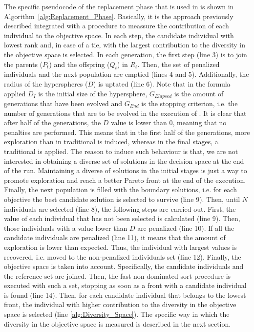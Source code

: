 The specific pseudocode of the replacement phase that is used in \VSDMOEA{} is shown in Algorithm~\ref{alg:Replacement_Phase}.
%
Basically, it is the approach previously described integrated with a procedure to meassure the contribution of each individual to the objective space.
%
In each step, the candidate individual with lowest rank and, in case of a tie, with the largest contribution to the diversity in the objective space is selected.
%
In each generation, the first step (line 3) is to join the parents ($P_t$) and the offspring ($Q_t$) in $R_t$.
%
Then, the set of penalized individuals and the next population are emptied (lines 4 and 5).
%
Additionally, the radius of the hyperspheres ($D$) is uptated (line 6).
%
Note that in the formula applied $D_I$ is the initial size of the hypersphere, $G_{Elapsed}$ is the amount of generations that have been evolved and $G_{End}$
is the stopping criterion, i.e. the number of generations that are to be evolved in the execution of \VSDMOEA{}.
%
It is clear that after half of the generations, the $D$ value is lower than 0, meaning that no penalties are performed.
%
This means that in the first half of the generations, more exploration than in traditional \MOEAS{} is induced, whereas 
in the final stages, a traditional \MOEA{} is applied.
%
The reason to induce such behaviour is that, we are not interested in obtaining a diverse set of solutions in the decision space at the end of the run.
%
Maintaining a diverse of solutions in the initial stages is just a way to promote exploration and reach a better Pareto front at the end of the execution.
%
Finally, the next population is filled with the boundary solutions, i.e. for each objective the best candidate solution is selected to survive (line 9).
%
Then, until $N$ individuals are selected (line 8), the following steps are carried out.
%
First, the \DCN{} value of each individual that has not been selected is calculated (line 9).
%
Then, those individuals with a \DCN{} value lower than $D$ are penalized (line 10).
%
If all the candidate individuals are penalized (line 11), it means that the amount of exploration is lower than expected.
%
Thus, the individual with largest \DCN{} values is recovered, i.e. moved to the non-penalized individuals set (line 12).
%
Finally, the objective space is taken into account.
%
Specifically, the candidate individuals and the reference set are joined.
%
Then, the fast-non-dominated-sort procedure is executed with such a set, stopping as soon as a front with a candidate individual is found (line 14).
%
Then, for each candidate individual that belongs to the lowest front, the individual with higher contribution to the diversity in the objective space is selected (line \ref{alg:Diversity_Space}).
%
The specific way in which the diversity in the objective space is measured is described in the next section.
%
%
%

